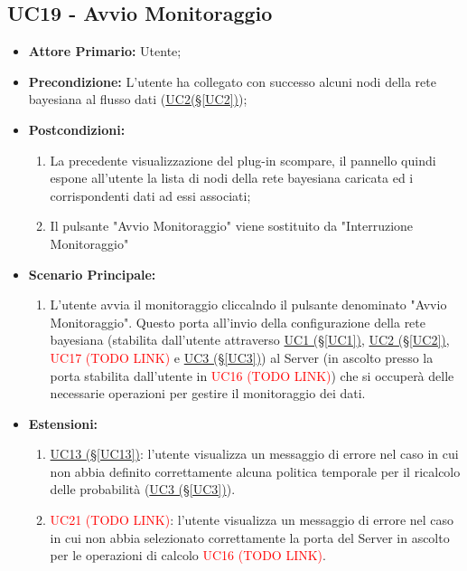 \pagebreak

\subsection{UC19 - Avvio Monitoraggio}\label{UC19}
\begin{itemize}
\item \textbf{Attore Primario:} Utente;
\item \textbf{Precondizione:} L'utente ha collegato con successo alcuni nodi della rete bayesiana al flusso dati (\hyperref[UC2]{UC2(§\ref*{UC2})});
\item \textbf{Postcondizioni:} 
	\begin{enumerate}
	\item La precedente visualizzazione del plug-in scompare, il pannello quindi espone all'utente la lista di nodi della rete bayesiana caricata ed i corrispondenti dati ad essi associati;
	\item Il pulsante "Avvio Monitoraggio" viene sostituito da "Interruzione Monitoraggio"
	\end{enumerate}
\item \textbf{Scenario Principale:}
	\begin{enumerate}
	\item L'utente avvia il monitoraggio cliccalndo il pulsante denominato "Avvio Monitoraggio". Questo porta all'invio della configurazione della rete bayesiana (stabilita dall'utente attraverso \hyperref[UC1]{UC1 (§\ref*{UC1})}, \hyperref[UC2]{UC2 (§\ref*{UC2})}, \textcolor{red}{UC17 (TODO LINK)} e \hyperref[UC3]{UC3 (§\ref*{UC3})}) al Server (in ascolto presso la porta stabilita dall'utente in \textcolor{red}{UC16 (TODO LINK)}) che si occuperà delle necessarie operazioni per gestire il monitoraggio dei dati.
	\end{enumerate}
\item \textbf{Estensioni:}
	\begin{enumerate}
	\item \hyperref[UC13]{UC13 (§\ref*{UC13})}: l'utente visualizza un messaggio di errore nel caso in cui non abbia definito correttamente alcuna politica temporale per il ricalcolo delle probabilità (\hyperref[UC3]{UC3 (§\ref*{UC3})}).
	\item \textcolor{red}{UC21 (TODO LINK)}: l'utente visualizza un messaggio di errore nel caso in cui non abbia selezionato correttamente la porta del Server in ascolto per le operazioni di calcolo \textcolor{red}{UC16 (TODO LINK)}.
	\end{enumerate}
\end{itemize}



